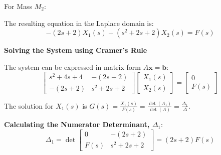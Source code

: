 \documentclass[11pt]{article}
\begin{document}
\vspace{12pt}
{For Mass $M_2$:}
\begin{figure}[h!]
\centering
{}
\end{figure}

The resulting equation in the Laplace domain is:
\begin{equation}
-(2s + 2)X_1(s) + (s^2 + 2s + 2)X_2(s) = F(s) \tag{2}
\end{equation}

\newpage
\noindent\textbf{Solving the System using Cramer's Rule}
\vspace{12pt}

The system can be expressed in matrix form $A\mathbf{x} = \mathbf{b}$:
$$
\begin{bmatrix}
s^2 + 4s + 4 & -(2s + 2) \\
-(2s + 2) & s^2 + 2s + 2
\end{bmatrix}
\begin{bmatrix}
X_1(s) \\
X_2(s)
\end{bmatrix}
=
\begin{bmatrix}
0 \\
F(s)
\end{bmatrix}
$$

The solution for $X_1(s)$ is $G(s) = \frac{X_1(s)}{F(s)} = \frac{\det(A_1)}{\det(A)} = \frac{\Delta_1}{\Delta}$.

\vspace{12pt}
\noindent\textbf{Calculating the Numerator Determinant, $\Delta_1$}:
$$ \Delta_1 = \det
\begin{bmatrix}
0 & -(2s + 2) \\
F(s) & s^2 + 2s + 2
\end{bmatrix}
= (2s + 2)F(s) $$
\end{document}
